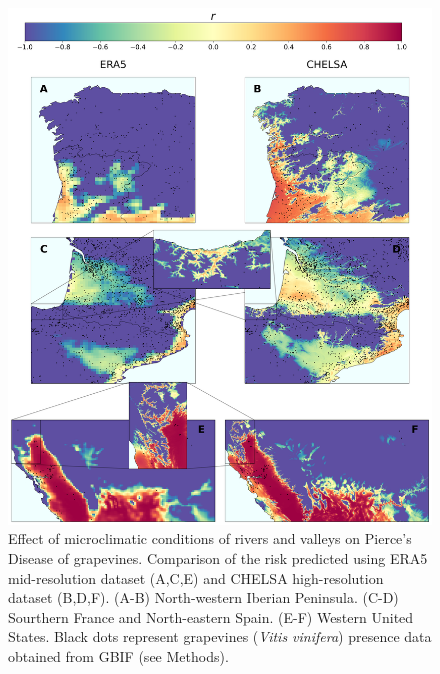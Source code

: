 \begin{figure}[H]
    \centering
    \includegraphics[width=\textwidth]{Figures/ERA5_vs_CHELSA_rivers.pdf}
    \caption{Effect of microclimatic conditions of rivers and valleys on
        Pierce's Disease of grapevines. Comparison of the risk predicted using
        ERA5
        mid-resolution dataset (A,C,E) and CHELSA high-resolution dataset
        (B,D,F).
        (A-B) North-western Iberian Peninsula. (C-D) Sourthern France and
        North-eastern
        Spain. (E-F) Western United States. Black dots represent grapevines
        (\textit{Vitis vinifera}) presence data obtained from GBIF (see
        Methods).}
    \label{fig:microclimates}
\end{figure}


